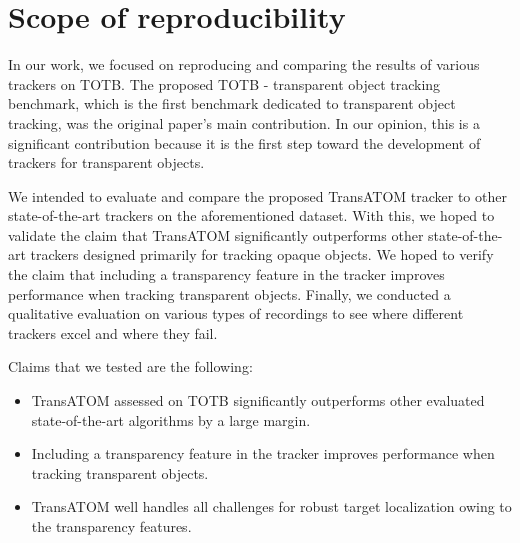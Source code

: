\section{Scope of reproducibility}
\label{sec:claims}

In our work, we focused on reproducing and comparing the results of various trackers on TOTB. The proposed TOTB - transparent object tracking benchmark, which is the first benchmark dedicated to transparent object tracking, was the original paper's main contribution. In our opinion, this is a significant contribution because it is the first step toward the development of trackers for transparent objects. 

We intended to evaluate and compare the proposed TransATOM tracker to other state-of-the-art trackers on the aforementioned dataset. With this, we hoped to validate the claim that TransATOM significantly outperforms other state-of-the-art trackers designed primarily for tracking opaque objects. We hoped to verify the claim that including a transparency feature in the tracker improves performance when tracking transparent objects. Finally, we conducted a qualitative evaluation on various types of recordings to see where different trackers excel and where they fail.


Claims that we tested are the following:
\begin{itemize}
    \item TransATOM assessed on TOTB significantly outperforms other evaluated state-of-the-art algorithms by a large margin.
    \item Including a transparency feature in the tracker improves performance when tracking transparent objects.
    \item TransATOM well handles all challenges  for robust target localization owing to the transparency features.
\end{itemize}